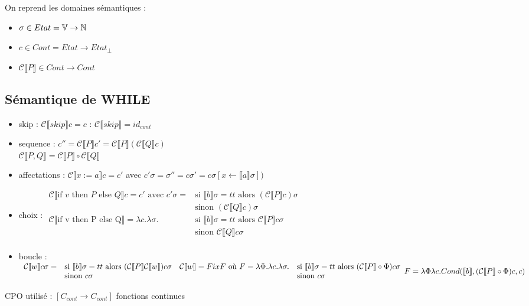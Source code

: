 \documentclass[10pt,a4paper]{article}
\newcommand{\semm}[1]{\llbracket #1 \rrbracket }
\newcommand{\Vs}{\mathbb{V}}
\begin{document}
On reprend les domaines sémantiques : 
\begin{itemize}
 \item $\sigma \in Etat = \Vs \to \Ns$
 \item $c \in Cont = Etat \to Etat_{\perp}$
 \item $\mathcal{C} \semm{P} \in Cont \to Cont$
\end{itemize}

\subsection{Sémantique de WHILE}

\begin{itemize}
 \item skip : $\mathcal{C}\semm{skip} c = c$ : $\mathcal{C}\semm{skip} = id_{cont}$\\
 \item sequence : $c'' = \mathcal{C}\semm{P} c' = \mathcal{C}\semm{P}(\mathcal{C}\semm{Q} c)$\\
		  $\mathcal{C}\semm{P, Q} = \mathcal{C}\semm{P} \circ \mathcal{C}\semm{Q}$\\
 \item affectations :  $\mathcal{C}\semm{x:=a} c = c'$ avec $c' \sigma = \sigma'' = c \sigma' = c \sigma[x \leftarrow \semm{a} \sigma])$\\
 \item choix : 
$\begin{array}{ll}
\mathcal{C}\semm{\text{if $v$ then $P$ else $Q$}} c = c'\text{ avec }c' \sigma =&\text{si }\semm{b} \sigma = tt \text{ alors } (\mathcal{C}\semm{P} c) \sigma \\
 &\text{sinon } (\mathcal{C}\semm{Q} c) \sigma\\
   \mathcal{C}\semm{\text{if v then P else Q}} = \lambda c. \lambda \sigma. &\text{si } \semm{b} \sigma = tt\text{ alors } \mathcal{C}\semm{P} c \sigma  \\
 &\text{sinon } \mathcal{C}\semm{Q} c \sigma\\
\end{array}$
 \item boucle : \\$
\begin{array}{ll}
 \mathcal{C}\semm{w} c \sigma = &\text{si } \semm{b} \sigma = tt \text{ alors } (\mathcal{C}\semm{P} \mathcal{C}\semm{w}) c \sigma \\
  &\text{sinon } c \sigma\\
\end{array}\\
\begin{array}{ll}
 \mathcal{C}\semm{w} = Fix F \text{ où } F = \lambda \Phi .  \lambda c. \lambda \sigma. &\text{si } \semm{b} \sigma = tt \text{ alors } (\mathcal{C}\semm{P} \circ \Phi) c \sigma \\
&\text{sinon } c \sigma\\ 
\end{array}\\
F = \lambda \Phi \lambda c . Cond ( \semm{b},  (\mathcal{C}\semm{P} \circ \Phi) c, c)\\
$
\end{itemize}
CPO utilisé : $[C_{cont} \to C_{cont}]$ fonctions continues
\end{document}
